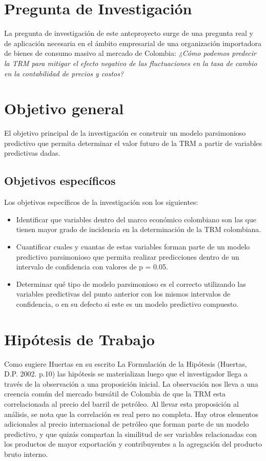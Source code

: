 \documentclass[letterpaper, spanish, 11pt]{report}
\begin{document}
\section{Pregunta de Investigación}
La pregunta de investigación de este anteproyecto surge de una pregunta real y de aplicación necesaria en el ámbito empresarial de una organización importadora de bienes de consumo masivo al mercado de Colombia: \emph{¿Cómo podemos predecir la TRM para mitigar el efecto negativo de las fluctuaciones en la tasa de cambio en la contabilidad de precios y costos?}

\section{Objetivo general}
El objetivo principal de la investigación es construir un modelo parsimonioso predictivo que permita determinar el valor futuro de la TRM a partir de variables predictivas dadas.

\subsection{Objetivos específicos}
Los objetivos específicos de la investigación son los siguientes:

\begin{itemize}
	\item Identificar que variables dentro del marco económico colombiano son las que tienen mayor grado de incidencia en la determinación de la TRM colombiana.
	\item Cuantificar cuales y cuantas de estas variables forman parte de un modelo predictivo parsimonioso que permita realizar predicciones dentro de un intervalo de confidencia con valores de p = 0.05.
	\item Determinar qué tipo de modelo parsimonioso es el correcto utilizando las variables predictivas del punto anterior con los mismos intervalos de confidencia, o en su defecto si este es un modelo predictivo compuesto.
\end{itemize}

\section{Hipótesis de Trabajo }
Como sugiere Huertas en su escrito La Formulación de la Hipótesis (Huertas, D.P. 2002. p.10) las hipótesis se materializan luego que el investigador llega a través de la observación a una proposición inicial. La observación nos lleva a una creencia común del mercado bursátil de Colombia de que la TRM esta correlacionada al precio del barril de petróleo. Al llevar esta proposición al análisis, se nota que la correlación es real pero no completa. Hay otros elementos adicionales al precio internacional de petróleo que forman parte de un modelo predictivo, y que quizás compartan la similitud de ser variables relacionadas con los productos de mayor exportación y contribuyentes a la agregación del producto bruto interno.
\end{document}
